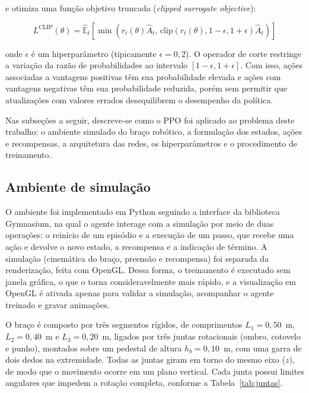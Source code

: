\noindent e otimiza uma função objetivo truncada (\textit{clipped surrogate objective}):

\begin{equation}
    L^{\text{CLIP}}(\theta) = \hat{\mathbb{E}}_t \left[ \min \left( r_t(\theta)\hat{A}_t, \, \text{clip}(r_t(\theta), 1-\epsilon, 1+\epsilon)\hat{A}_t \right) \right]
    \label{eq:ppo_clip}
\end{equation}

\noindent onde $\epsilon$ é um hiperparâmetro (tipicamente $\epsilon = 0{,}2$). O operador de corte restringe a variação da razão de probabilidades ao intervalo $[1-\epsilon, 1+\epsilon]$. Com isso, ações associadas a vantagens positivas têm sua probabilidade elevada e ações com vantagens negativas têm sua probabilidade reduzida, porém sem permitir que atualizações com valores errados desequilibrem o desempenho da política.


Nas subseções a seguir, descreve-se como o PPO foi aplicado ao problema deste trabalho: o ambiente simulado do braço robótico, a formulação dos estados, ações e recompensas, a arquitetura das redes, os hiperparâmetros e o procedimento de treinamento.

\subsection{Ambiente de simulação}

O ambiente foi implementado em Python seguindo a interface da biblioteca Gymnasium, na qual o agente interage com a simulação por meio de duas operações: o reinício de um episódio e a execução de um passo, que recebe uma ação e devolve o novo estado, a recompensa e a indicação de término. A simulação (cinemática do braço, preensão e recompensa) foi separada da renderização, feita com OpenGL. Dessa forma, o treinamento é executado sem janela gráfica, o que o torna consideravelmente mais rápido, e a visualização em OpenGL é ativada apenas para validar a simulação, acompanhar o agente treinado e gravar animações.

O braço é composto por três segmentos rígidos, de comprimentos $L_1 = 0{,}50$~m, $L_2 = 0{,}40$~m e $L_3 = 0{,}20$~m, ligados por três juntas rotacionais (ombro, cotovelo e punho), montados sobre um pedestal de altura $h_b = 0{,}10$~m, com uma garra de dois dedos na extremidade. Todas as juntas giram em torno do mesmo eixo ($z$), de modo que o movimento ocorre em um plano vertical. Cada junta possui limites angulares que impedem a rotação completa, conforme a Tabela~\ref{tab:juntas}.


